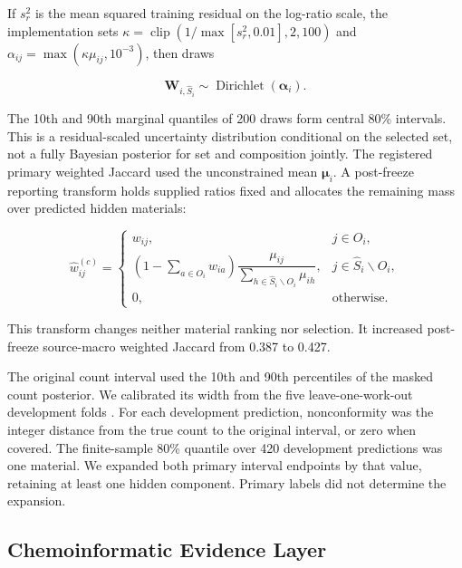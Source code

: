 \documentclass[11pt]{article}
\begin{document}
If \(s_r^2\) is the mean squared training residual on the log-ratio scale, the implementation sets \(\kappa=\operatorname{clip}(1/\max[s_r^2,0.01],2,100)\) and \(\alpha_{ij}=\max(\kappa\mu_{ij},10^{-3})\), then draws

\begin{equation}
\label{eq:dirichlet-composition}
\mathbf W_{i,\widehat S_i}\sim\operatorname{Dirichlet}(\boldsymbol\alpha_i).
\end{equation}

The 10th and 90th marginal quantiles of 200 draws form central 80\% intervals. This is a residual-scaled uncertainty distribution conditional on the selected set, not a fully Bayesian posterior for set and composition jointly. The registered primary weighted Jaccard used the unconstrained mean \(\boldsymbol\mu_i\). A post-freeze reporting transform holds supplied ratios fixed and allocates the remaining mass over predicted hidden materials:

\begin{equation}
\label{eq:mass-constraint}
\widehat w^{(c)}_{ij}=\begin{cases}w_{ij},&j\in O_i,\\ \left(1-\sum_{a\in O_i}w_{ia}\right)\dfrac{\mu_{ij}}{\sum_{h\in\widehat S_i\mathbin{\backslash} O_i}\mu_{ih}},&j\in\widehat S_i\mathbin{\backslash} O_i,\\0,&\text{otherwise}.\end{cases}
\end{equation}

This transform changes neither material ranking nor selection. It increased post-freeze source-macro weighted Jaccard from 0.387 to 0.427.

The original count interval used the 10th and 90th percentiles of the masked count posterior. We calibrated its width from the five leave-one-work-out development folds \cite{ref18}. For each development prediction, nonconformity was the integer distance from the true count to the original interval, or zero when covered. The finite-sample 80\% quantile over 420 development predictions was one material. We expanded both primary interval endpoints by that value, retaining at least one hidden component. Primary labels did not determine the expansion.

\subsection{Chemoinformatic Evidence Layer}
\end{document}
